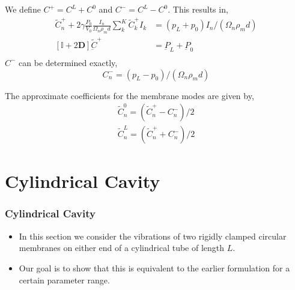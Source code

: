 \documentclass{beamer}
\begin{document}
\begin{frame}
 We define $C^+=C^L+C^0$ and $C^-=C^L-C^0$. This results in,
 \begin{align}
  \widetilde{C}^+_n+2\gamma\frac{P_0}{V_0}\frac{I_n}{\Omega_n\rho_md}\sum^K_k\widetilde{C}^+_kI_k&=(p_L+p_0)I_n/(\Omega_n\rho_md)\\
  \left[\mathbb{I}+2\mathbf{D}\right]\widetilde{\underbar{C}}^+&=\underbar{P}_L+\underbar{P}_0\\
 \end{align}
 $C^-$ can be determined exactly,
 \begin{equation}
    C^-_n=(p_L-p_0)/(\Omega_n\rho_md)
 \end{equation}
 \end{frame}
\begin{frame}
 The approximate coefficients for the membrane modes are given by,
 \begin{align}
  \widetilde{C}^0_n=(\widetilde{C}^+_n-C^-_n)/2\\
  \widetilde{C}^L_n=(\widetilde{C}^+_n+C^-_n)/2
 \end{align}
\end{frame}

\section{Cylindrical Cavity}
\begin{frame}
 \frametitle{Cylindrical Cavity}
 \begin{itemize}
  \item In this section we consider the vibrations of two rigidly clamped circular membranes on either end
  of a cylindrical tube of length $L$.
  \item Our goal is to show that this is equivalent to the earlier formulation for a certain parameter range.
 \end{itemize}
\end{frame}
\end{document}
